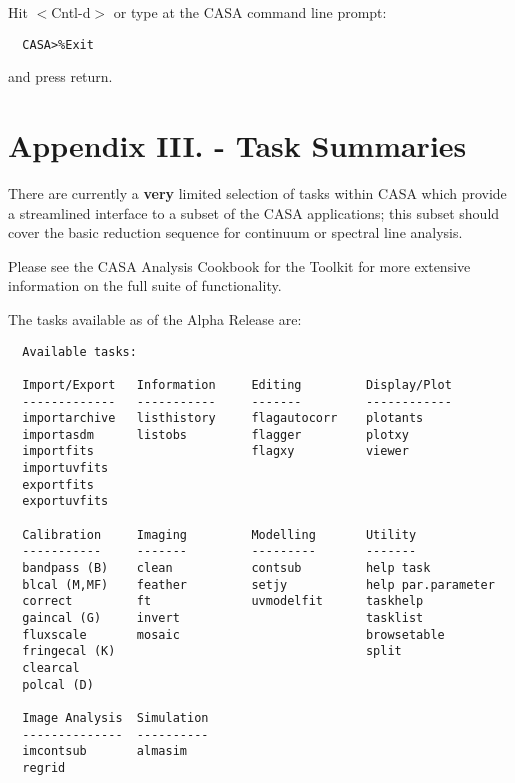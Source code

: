   Hit $<$Cntl-d$>$ or type at the CASA command line prompt:

\small
\begin{verbatim}
  CASA>%Exit
\end{verbatim}
\normalsize

and press return.


\chapter{Appendix III. - Task Summaries}
\label{chapter:app.3}

\vspace{3mm}

There are currently a {\bf very} limited selection of tasks within
CASA which provide a streamlined interface to a subset of the CASA
applications; this subset should cover the basic reduction sequence
for continuum or spectral line analysis.

Please see the CASA Analysis Cookbook for the Toolkit for more
extensive information on the full suite of functionality.

The tasks available as of the Alpha Release are: 

\small
\begin{verbatim}
  Available tasks: 

  Import/Export   Information     Editing         Display/Plot
  -------------   -----------     -------         ------------
  importarchive   listhistory     flagautocorr    plotants
  importasdm      listobs         flagger         plotxy 
  importfits                      flagxy          viewer
  importuvfits
  exportfits
  exportuvfits

  Calibration     Imaging         Modelling       Utility
  -----------     -------         ---------       -------
  bandpass (B)    clean           contsub         help task
  blcal (M,MF)    feather         setjy           help par.parameter
  correct         ft              uvmodelfit      taskhelp
  gaincal (G)     invert                          tasklist
  fluxscale       mosaic                          browsetable
  fringecal (K)                                   split
  clearcal
  polcal (D)

  Image Analysis  Simulation
  --------------  ----------
  imcontsub       almasim
  regrid
\end{verbatim}
\normalsize

